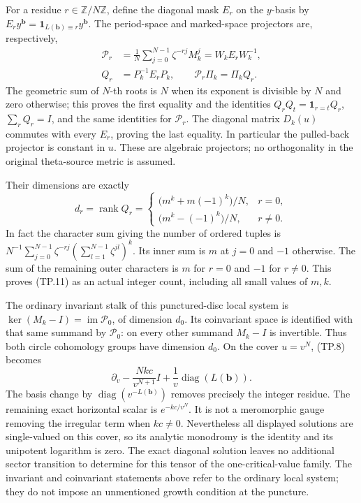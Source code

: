 For a residue \(r\in\mathbb Z/N\mathbb Z\), define the diagonal
mask \(E_r\) on the \(y\)-basis by
\(E_r y^{\mathbf b}=\mathbf1_{L(\mathbf b)\equiv r}y^{\mathbf b}\).
The period-space and marked-space projectors are, respectively,
\[
 \begin{split}
 \mathcal P_r&=\frac1N\sum_{j=0}^{N-1}\zeta^{-rj}M_k^j
             =W_kE_rW_k^{-1},\\
 Q_r&=P_k^{-1}E_rP_k,\qquad
       \mathcal P_r\Pi_k=\Pi_k Q_r .
 \end{split}
 \tag{TP.10}\label{CFStage:eq:tp-projector}
\]
The geometric sum of \(N\)-th roots is \(N\) when its exponent
is divisible by \(N\) and zero otherwise; this proves the first
equality and the identities
\(Q_rQ_t=\mathbf1_{r=t}Q_r\), \(\sum_rQ_r=I\), and the same
identities for \(\mathcal P_r\). The diagonal matrix \(D_k(u)\)
commutes with every \(E_r\), proving the last equality. In
particular the pulled-back projector is constant in \(u\).
These are algebraic projectors; no orthogonality in the original
theta-source metric is assumed.

Their dimensions are exactly
\[
 d_r=\operatorname{rank}Q_r
  =\begin{cases}
  \bigl(m^k+m(-1)^k\bigr)/N,&r=0,\\
  \bigl(m^k-(-1)^k\bigr)/N,&r\ne0.
  \end{cases}
 \tag{TP.11}\label{CFStage:eq:tp-count}
\]
In fact the character sum giving the number of ordered tuples is
\(N^{-1}\sum_{j=0}^{N-1}\zeta^{-rj}
(\sum_{l=1}^{N-1}\zeta^{jl})^k\). Its inner sum is \(m\) at
\(j=0\) and \(-1\) otherwise. The sum of the remaining outer
characters is \(m\) for \(r=0\) and \(-1\) for \(r\ne0\).
This proves (TP.11) as an actual integer count, including all
small values of \(m,k\).

The ordinary invariant stalk of this punctured-disc local system
is \(\ker(M_k-I)=\operatorname{im}\mathcal P_0\), of dimension
\(d_0\). Its coinvariant space is identified with that same
summand by \(\mathcal P_0\): on every other summand \(M_k-I\)
is invertible. Thus both circle cohomology groups have dimension
\(d_0\). On the cover \(u=v^N\), (TP.8) becomes
\[
 \partial_v-\frac{Nkc}{v^{N+1}}I
       +\frac1v\operatorname{diag}(L(\mathbf b)).
 \tag{TP.12}\label{CFStage:eq:tp-cover}
\]
The basis change by \(\operatorname{diag}(v^{-L(\mathbf b)})\)
removes precisely the integer residue. The remaining exact
horizontal scalar is \(e^{-kc/v^N}\). It is not a meromorphic
gauge removing the irregular term when \(kc\ne0\).
Nevertheless all displayed solutions are single-valued on this
cover, so its analytic monodromy is the identity and its
unipotent logarithm is zero. The exact diagonal solution leaves
no additional sector transition to determine for this tensor
of the one-critical-value family. The invariant and coinvariant
statements above refer to the ordinary local system; they do not
impose an unmentioned growth condition at the puncture.

